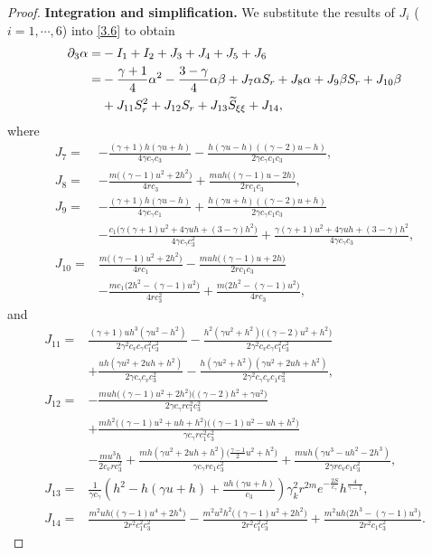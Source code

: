 \documentclass[11pt,reqno]{article}
\numberwithin{equation}{section}
\begin{document}
\begin{proof}
\noindent\textbf{Integration and simplification.} We substitute the results of $J_{i}$ ($i=1,\cdots,6$) into \eqref{3.6} to obtain
\begin{align}\label{3.7}
\partial_3 \alpha=&-I_1+I_2+J_3+J_{4}+J_{5}+J_{6}\notag\\
=&-\frac{\gamma+1}{4}\alpha^{2}
- \frac{3-\gamma}{4}\alpha\beta +J_7\alpha S_{r} +J_8\alpha +J_9\beta S_r +J_{10}\beta \notag \\
&+J_{11}S_{r}^2 +J_{12}S_r +J_{13}\widetilde{S}_{\xi\xi}  +J_{14},
\end{align}
where
\begin{align*}
J_7=&- \frac{(\gamma+1)h(\gamma u+h)}{4\gamma c_\gamma c_3}
   - \frac{h(\gamma u-h)((\gamma-2)u-h)}{2\gamma c_\gamma c_1 c_3}, \\
J_8=&- \frac{m\big((\gamma-1)u^2+2h^2\big)}{4r c_3}
   + \frac{muh\big((\gamma-1)u-2h\big)}{2r c_1 c_3}, \\
J_9=& -\frac{(\gamma+1)h(\gamma u-h)}{4\gamma c_\gamma c_1}
   + \frac{h(\gamma u+h)((\gamma-2)u+h)}{2\gamma c_\gamma c_1 c_3} \\
&- \frac{c_1\big(\gamma(\gamma+1)u^2+4\gamma uh+(3-\gamma)h^2\big)}{4\gamma c_\gamma c_3^2} + \frac{\gamma(\gamma+1)u^2+4\gamma uh+(3-\gamma)h^2}{4\gamma c_\gamma c_3}, \\
J_{10}=& \frac{m\big((\gamma-1)u^2+2h^2\big)}{4r c_1}
   - \frac{muh\big((\gamma-1)u+2h\big)}{2r c_1 c_3} \\
&- \frac{m c_1\big(2h^2-(\gamma-1)u^2\big)}{4r c_3^2} + \frac{m\big(2h^2-(\gamma-1)u^2\big)}{4r c_3},
\end{align*}
and
\begin{align*}
J_{11}=& \frac{(\gamma+1)uh^{3}(\gamma u^{2}-h^{2})}{2\gamma^{2} c_v c_\gamma c_1^{2} c_3^{2}}
   - \frac{h^{2}(\gamma u^{2}+h^{2})\big((\gamma-2)u^{2}+h^{2}\big)}{2\gamma^{2} c_v c_\gamma c_1^{2} c_3^{2}}  \\
&+ \frac{uh(\gamma u^{2}+2uh+h^{2})}{2\gamma c_\gamma c_v c_3^{2}}
   - \frac{h(\gamma u^{2}+h^{2})(\gamma u^{2}+2uh+h^{2})}{2\gamma^{2} c_\gamma c_v c_1 c_3^{2}}, \\
J_{12}=& -\frac{muh\big((\gamma-1)u^{2}+2h^{2}\big)\big((\gamma-2)h^{2}+\gamma u^{2}\big)}{2\gamma c_\gamma r c_1^{2} c_3^{2}} \\
&+ \frac{mh^{2}\big((\gamma-1)u^{2}+uh+h^{2}\big)\big((\gamma-1)u^{2}-uh+h^{2}\big)}{\gamma c_\gamma r c_1^{2} c_3^{2}}   \\
&- \frac{m u^{3} h}{2c_v r c_3^{2}}
   + \frac{mh(\gamma u^{2}+2uh+h^{2})\big(\frac{\gamma-1}{2}u^{2}+h^{2}\big)}{\gamma c_\gamma r c_1 c_3^{2}}
   + \frac{muh(\gamma u^{3}-uh^{2}-2h^{3})}{2\gamma r c_v c_1 c_3^{2}}, \\
J_{13}=& \frac{1}{\gamma c_{\gamma}}
\left( h^2 - h(\gamma u+h) + \frac{uh(\gamma u+h)}{c_3} \right)\gamma_k^2 r^{2m} e^{-\frac{2S}{c_\gamma}} h^{\frac{4}{\gamma-1}}, \\
J_{14}=&\frac{m^{2}uh\big((\gamma-1)u^{4}+2h^{4}\big)}{2r^{2} c_1^{2} c_3^{2}} - \frac{m^{2}u^{2}h^{2}\big((\gamma-1)u^{2}+2h^{2}\big)}{2r^{2} c_1^{2} c_3^{2}} + \frac{m^2u h\big(2h^{3}-(\gamma-1)u^{3}\big)}{2r^{2} c_1 c_3^{2}}.
\end{align*}


\end{proof}
\end{document}
